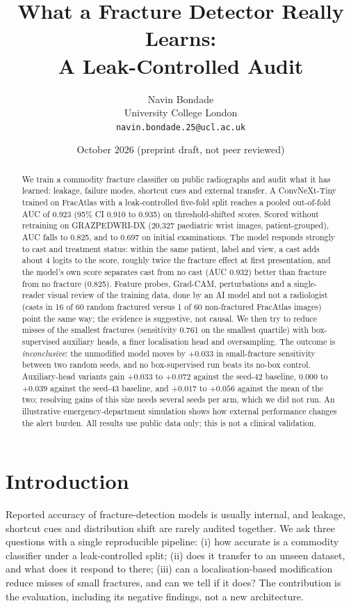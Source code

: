 \documentclass[11pt]{article}
\title{\textbf{What a Fracture Detector Really Learns:\\A Leak-Controlled Audit}}
\author{Navin Bondade\\University College London\\\texttt{navin.bondade.25@ucl.ac.uk}}
\date{October 2026 \;(preprint draft, not peer reviewed)}
\begin{document}
\maketitle

\begin{abstract}
We train a commodity fracture classifier on public radiographs and audit what it has learned: leakage, failure modes, shortcut cues and external transfer.
A ConvNeXt-Tiny trained on FracAtlas with a leak-controlled five-fold split reaches a pooled out-of-fold AUC of 0.923 (95\% CI 0.910 to 0.935) on threshold-shifted scores.
Scored without retraining on GRAZPEDWRI-DX (20,327 paediatric wrist images, patient-grouped), AUC falls to 0.825, and to 0.697 on initial examinations.
The model responds strongly to cast and treatment status: within the same patient, label and view, a cast adds about 4 logits to the score, roughly twice the fracture effect at first presentation, and the model's own score separates cast from no cast (AUC 0.932) better than fracture from no fracture (0.825).
Feature probes, Grad-CAM, perturbations and a single-reader visual review of the training data, done by an AI model and not a radiologist (casts in 16 of 60 random fractured versus 1 of 60 non-fractured FracAtlas images) point the same way; the evidence is suggestive, not causal.
We then try to reduce misses of the smallest fractures (sensitivity 0.761 on the smallest quartile) with box-supervised auxiliary heads, a finer localisation head and oversampling.
The outcome is \emph{inconclusive}: the unmodified model moves by $+0.033$ in small-fracture sensitivity between two random seeds, and no box-supervised run beats its no-box control. Auxiliary-head variants gain $+0.033$ to $+0.072$ against the seed-42 baseline, $0.000$ to $+0.039$ against the seed-43 baseline, and $+0.017$ to $+0.056$ against the mean of the two; resolving gains of this size needs several seeds per arm, which we did not run.
An illustrative emergency-department simulation shows how external performance changes the alert burden.
All results use public data only; this is not a clinical validation.
\end{abstract}

\section{Introduction}
Reported accuracy of fracture-detection models is usually internal, and leakage, shortcut cues and distribution shift are rarely audited together.
We ask three questions with a single reproducible pipeline: (i) how accurate is a commodity classifier under a leak-controlled split; (ii) does it transfer to an unseen dataset, and what does it respond to there; (iii) can a localisation-based modification reduce misses of small fractures, and can we tell if it does?
The contribution is the evaluation, including its negative findings, not a new architecture.
\end{document}
